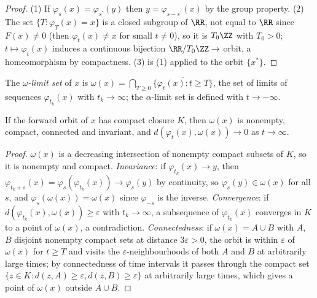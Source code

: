\begin{proof}
(1) If $\varphi_s(x) = \varphi_{s^{\prime}}(y)$ then $y = \varphi_{s - s^{\prime}}(x)$ by the group property. (2) The set $\{T : \varphi_T(x) = x\}$ is a closed subgroup of $\RR$, not equal to $\RR$ since $F(x) \neq 0$ (then $\varphi_t(x) \neq x$ for small
$t \neq 0$), so it is $T_0\ZZ$ with $T_0 > 0$; $t \mapsto \varphi_t(x)$ induces a continuous bijection $\RR/T_0\ZZ \to$ orbit, a homeomorphism by compactness. (3) is (1) applied to the orbit $\{x^*\}$.
\end{proof}

\begin{definition}\label{ordinary-differential-equations:definition-limit-set}
The \emph{$\omega$-limit set} of $x$ is $\omega(x) = \bigcap_{T \geq 0}\overline{\{\varphi_t(x) : t \geq T\}}$, the set of limits of sequences $\varphi_{t_k}(x)$ with $t_k \to \infty$; the $\alpha$-limit set is defined with $t \to -\infty$.
\end{definition}

\begin{proposition}\label{ordinary-differential-equations:proposition-limit-sets}
If the forward orbit of $x$ has compact closure $K$, then $\omega(x)$ is nonempty, compact, connected and invariant, and $d(\varphi_t(x), \omega(x)) \to 0$ as $t \to \infty$.
\end{proposition}

\begin{proof}
$\omega(x)$ is a decreasing intersection of nonempty compact subsets of $K$, so it is nonempty and compact. \emph{Invariance}: if $\varphi_{t_k}(x) \to y$, then $\varphi_{t_k + s}(x) = \varphi_s(\varphi_{t_k}(x)) \to \varphi_s(y)$ by continuity, so
$\varphi_s(y) \in \omega(x)$ for all $s$, and $\varphi_s(\omega(x)) = \omega(x)$ since $\varphi_{-s}$ is the inverse. \emph{Convergence}: if $d(\varphi_{t_k}(x), \omega(x)) \geq \varepsilon$ with $t_k \to \infty$, a subsequence of $\varphi_{t_k}(x)$ converges
in $K$ to a point of $\omega(x)$, a contradiction. \emph{Connectedness}: if $\omega(x) = A \cup B$ with $A$, $B$ disjoint nonempty compact sets at distance $3\varepsilon > 0$, the orbit is within $\varepsilon$ of $\omega(x)$ for $t \geq T$ and visits the
$\varepsilon$-neighbourhoods of both $A$ and $B$ at arbitrarily large times; by connectedness of time intervals it passes through the compact set $\{z \in K : d(z, A) \geq \varepsilon, d(z, B) \geq \varepsilon\}$ at arbitrarily large times, which gives a point
of $\omega(x)$ outside $A \cup B$.
\end{proof}


